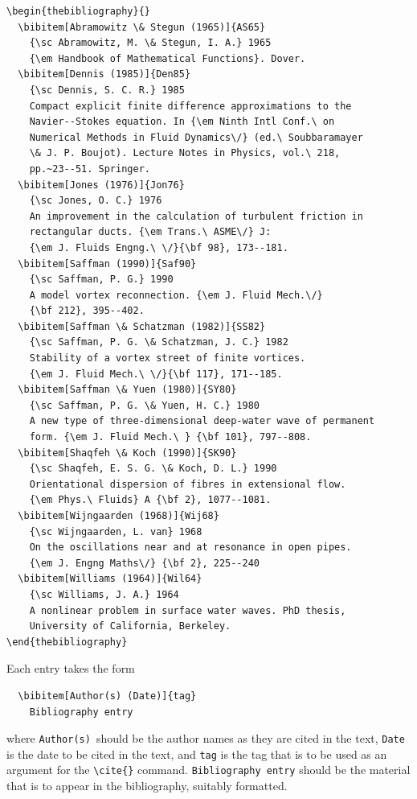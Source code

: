 \smallskip
\begin{verbatim}
\begin{thebibliography}{} 
  \bibitem[Abramowitz \& Stegun (1965)]{AS65}
    {\sc Abramowitz, M. \& Stegun, I. A.} 1965
    {\em Handbook of Mathematical Functions}. Dover.
  \bibitem[Dennis (1985)]{Den85}
    {\sc Dennis, S. C. R.} 1985
    Compact explicit finite difference approximations to the
    Navier--Stokes equation. In {\em Ninth Intl Conf.\ on
    Numerical Methods in Fluid Dynamics\/} (ed.\ Soubbaramayer
    \& J. P. Boujot). Lecture Notes in Physics, vol.\ 218,
    pp.~23--51. Springer.
  \bibitem[Jones (1976)]{Jon76}
    {\sc Jones, O. C.} 1976
    An improvement in the calculation of turbulent friction in
    rectangular ducts. {\em Trans.\ ASME\/} J:
    {\em J. Fluids Engng.\ \/}{\bf 98}, 173--181.
  \bibitem[Saffman (1990)]{Saf90}
    {\sc Saffman, P. G.} 1990
    A model vortex reconnection. {\em J. Fluid Mech.\/}
    {\bf 212}, 395--402.
  \bibitem[Saffman \& Schatzman (1982)]{SS82}
    {\sc Saffman, P. G. \& Schatzman, J. C.} 1982
    Stability of a vortex street of finite vortices.
    {\em J. Fluid Mech.\ \/}{\bf 117}, 171--185.
  \bibitem[Saffman \& Yuen (1980)]{SY80}
    {\sc Saffman, P. G. \& Yuen, H. C.} 1980
    A new type of three-dimensional deep-water wave of permanent
    form. {\em J. Fluid Mech.\ } {\bf 101}, 797--808.
  \bibitem[Shaqfeh \& Koch (1990)]{SK90}
    {\sc Shaqfeh, E. S. G. \& Koch, D. L.} 1990
    Orientational dispersion of fibres in extensional flow.
    {\em Phys.\ Fluids} A {\bf 2}, 1077--1081.
  \bibitem[Wijngaarden (1968)]{Wij68}
    {\sc Wijngaarden, L. van} 1968
    On the oscillations near and at resonance in open pipes.
    {\em J. Engng Maths\/} {\bf 2}, 225--240
  \bibitem[Williams (1964)]{Wil64}
    {\sc Williams, J. A.} 1964
    A nonlinear problem in surface water waves. PhD thesis,
    University of California, Berkeley.
\end{thebibliography}
\end{verbatim}
\smallskip

\noindent
Each entry takes the form

\smallskip
\begin{verbatim}
  \bibitem[Author(s) (Date)]{tag}
    Bibliography entry
\end{verbatim}
\smallskip

\noindent
where \verb"Author(s)"\ should be the author names as they are cited in
the text, \verb"Date" is the date to be cited in the text, and \verb"tag"
is the tag that is to be used as an argument for the \verb"\cite{}" command.
\verb"Bibliography entry" should be the material that is to appear in the
bibliography, suitably formatted.


